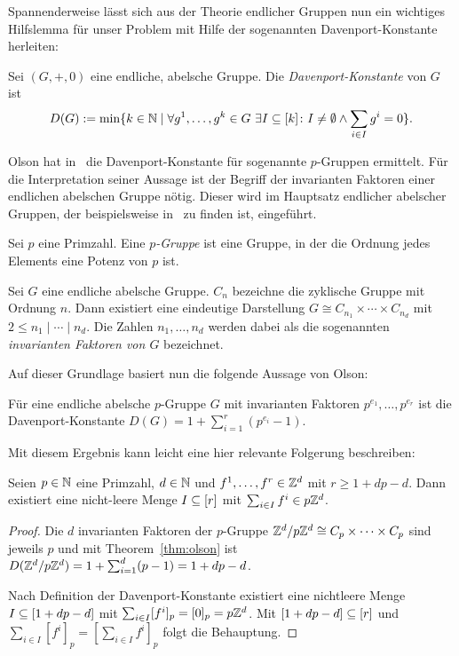 Spannenderweise lässt sich aus der Theorie endlicher Gruppen nun ein wichtiges Hilfslemma für unser Problem mit Hilfe der sogenannten Davenport-Konstante herleiten:

\begin{definition}
	Sei $(G,+,0)$ eine endliche, abelsche Gruppe.
	Die {\em Davenport-Konstante} von $G$ ist
	$$
		D(G):=\min\{k\in\mathbb{N} \mid \forall g^1,\dots,g^k \in G~\exists I\subseteq[k]\colon I\neq\emptyset \wedge \sum_{i\in I}g^i=0  \} .
	$$
\end{definition}

Olson hat in~\cite{Olson1969} die Davenport-Konstante für sogenannte $p$-Gruppen ermittelt.
Für die Interpretation seiner Aussage ist der Begriff der invarianten Faktoren einer endlichen abelschen Gruppe nötig.
Dieser wird im Hauptsatz endlicher abelscher Gruppen, der beispielsweise in~\cite[Satz 10.6]{Karpfinger2017} zu finden ist, eingeführt.

\begin{definition}[$p$-Gruppe]
	Sei $p$ eine Primzahl.
	Eine \emph{$p$-Gruppe} ist eine Gruppe, in der die Ordnung jedes Elements eine Potenz von $p$ ist.
\end{definition}
\begin{theorem}
	Sei $G$ eine endliche abelsche Gruppe.
	$C_n$ bezeichne die zyklische Gruppe mit Ordnung $n$.
	Dann existiert eine eindeutige Darstellung $G\cong C_{n_1}\times\cdots\times C_{n_d}$ mit $2\leq n_1\mid\cdots\mid n_d$.
	Die Zahlen $n_1,\dots,n_d$ werden dabei als die sogenannten \emph{invarianten Faktoren von $G$} bezeichnet.
\end{theorem}

Auf dieser Grundlage basiert nun die folgende Aussage von Olson:

\begin{theorem}[Olson, 1969]\label{thm:olson}
	Für eine endliche abelsche $p$-Gruppe $G$ mit invarianten Faktoren $p^{e_1},\dots,p^{e_r}$ ist die Davenport-Konstante $D(G)=1+\sum_{i=1}^r(p^{e_i}-1)$.
\end{theorem}

Mit diesem Ergebnis kann leicht eine hier relevante Folgerung beschreiben:

\begin{corollary}\label{cor:olson}
	Seien $p\in\mathbb{N}$ eine Primzahl, $d\in\mathbb{N}$ und $f^1,\dots,f^r\in\mathbb{Z}^d$ mit $r\geq 1+dp-d$.
	Dann existiert eine nicht-leere Menge $I\subseteq[r]$ mit $\sum_{i\in I}f^i\in p\mathbb{Z}^d$.
\end{corollary}
\begin{proof}
	Die $d$ invarianten Faktoren der $p$-Gruppe $\mathbb{Z}^d/p\mathbb{Z}^d\cong C_p\times\dots\times C_p$ sind jeweils $p$ und mit Theorem~\ref{thm:olson} ist $D(\mathbb{Z}^d/p\mathbb{Z}^d)=1+\sum_{i=1}^d(p-1)=1+dp-d$.
	
	Nach Definition der Davenport-Konstante existiert eine nichtleere Menge $I\subseteq[1+dp-d]$ mit $\sum_{i\in I}[f^i]_p=[0]_p=p\mathbb{Z}^d$.
	Mit $[1+dp-d]\subseteq[r]$ und $\sum_{i\in I}[f^i]_p=[\sum_{i\in I}f^i]_p$ folgt die Behauptung.
\end{proof}

